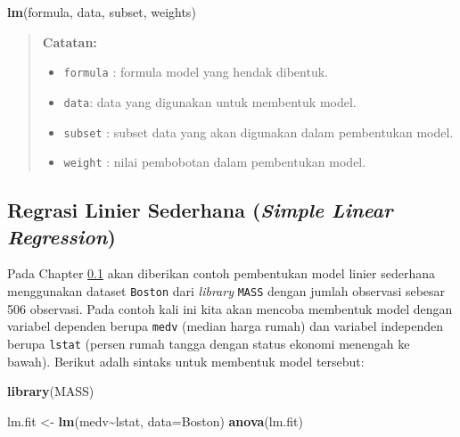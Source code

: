\documentclass[
]{book}
\newenvironment{Shaded}{\begin{snugshade}}{\end{snugshade}}
\newcommand{\AttributeTok}[1]{\textcolor[rgb]{0.13,0.29,0.53}{#1}}
\newcommand{\FunctionTok}[1]{\textcolor[rgb]{0.13,0.29,0.53}{\textbf{#1}}}
\newcommand{\NormalTok}[1]{#1}
\newcommand{\OtherTok}[1]{\textcolor[rgb]{0.56,0.35,0.01}{#1}}
\newcommand{\SpecialCharTok}[1]{\textcolor[rgb]{0.81,0.36,0.00}{\textbf{#1}}}
\providecommand{\tightlist}{%
  \setlength{\itemsep}{0pt}\setlength{\parskip}{0pt}}
\theoremstyle{definition}
\theoremstyle{definition}
\theoremstyle{definition}
\theoremstyle{definition}
\theoremstyle{remark}
\begin{document}
\begin{Shaded}
\begin{Highlighting}[]
\FunctionTok{lm}\NormalTok{(formula, data, subset, weights)}
\end{Highlighting}
\end{Shaded}

\begin{quote}
\textbf{Catatan:}

\begin{itemize}
\tightlist
\item
  \texttt{formula} : formula model yang hendak dibentuk.
\item
  \texttt{data}: data yang digunakan untuk membentuk model.
\item
  \texttt{subset} : subset data yang akan digunakan dalam pembentukan model.
\item
  \texttt{weight} : nilai pembobotan dalam pembentukan model.
\end{itemize}
\end{quote}

\hypertarget{SLR}{%
\subsection{\texorpdfstring{Regrasi Linier Sederhana (\emph{Simple Linear Regression})}{Regrasi Linier Sederhana (Simple Linear Regression)}}\label{SLR}}

Pada Chapter \ref{SLR} akan diberikan contoh pembentukan model linier sederhana menggunakan dataset \texttt{Boston} dari \emph{library} \texttt{MASS} dengan jumlah observasi sebesar 506 observasi. Pada contoh kali ini kita akan mencoba membentuk model dengan variabel dependen berupa \texttt{medv} (median harga rumah) dan variabel independen berupa \texttt{lstat} (persen rumah tangga dengan status ekonomi menengah ke bawah). Berikut adalh sintaks untuk membentuk model tersebut:

\begin{Shaded}
\begin{Highlighting}[]
\FunctionTok{library}\NormalTok{(MASS)}
\end{Highlighting}
\end{Shaded}

\begin{Shaded}
\begin{Highlighting}[]
\NormalTok{lm.fit }\OtherTok{\textless{}{-}} \FunctionTok{lm}\NormalTok{(medv}\SpecialCharTok{\textasciitilde{}}\NormalTok{lstat, }\AttributeTok{data=}\NormalTok{Boston)}
\FunctionTok{anova}\NormalTok{(lm.fit)}
\end{Highlighting}
\end{Shaded}
\end{document}
